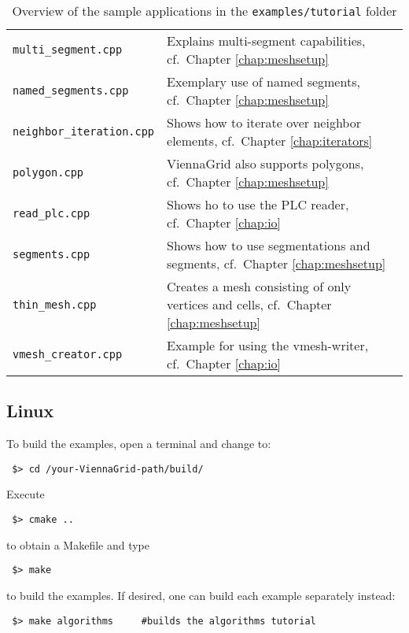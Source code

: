 \begin{table}[tbp]
\begin{center}
\begin{tabular}{l|p{9.3cm}}
\texttt{multi\_segment.cpp}        & Explains multi-segment capabilities, cf.~Chapter \ref{chap:meshsetup} \\
\texttt{named\_segments.cpp}       & Exemplary use of named segments, cf.~Chapter \ref{chap:meshsetup} \\
\texttt{neighbor\_iteration.cpp}   & Shows how to iterate over neighbor elements, cf.~Chapter \ref{chap:iterators} \\
\texttt{polygon.cpp}               & ViennaGrid also supports polygons, cf.~Chapter \ref{chap:meshsetup} \\
\texttt{read\_plc.cpp}             & Shows ho to use the PLC reader, cf.~Chapter \ref{chap:io} \\
\texttt{segments.cpp}              & Shows how to use segmentations and segments, cf.~Chapter \ref{chap:meshsetup} \\
\texttt{thin\_mesh.cpp}            & Creates a mesh consisting of only vertices and cells, cf.~Chapter \ref{chap:meshsetup} \\
\texttt{vmesh\_creator.cpp}        & Example for using the vmesh-writer, cf.~Chapter \ref{chap:io} \\
\end{tabular}
\caption{Overview of the sample applications in the \texttt{examples/tutorial} folder}
\label{tab:tutorial-dependencies}
\end{center}
\end{table}

\subsection{Linux}
To build the examples, open a terminal and change to:

\begin{lstlisting}
 $> cd /your-ViennaGrid-path/build/
\end{lstlisting}
Execute
\begin{lstlisting}
 $> cmake ..
\end{lstlisting}
to obtain a Makefile and type
\begin{lstlisting}
 $> make
\end{lstlisting}
to build the examples. If desired, one can build each example separately instead:
\begin{lstlisting}
 $> make algorithms     #builds the algorithms tutorial
\end{lstlisting}


